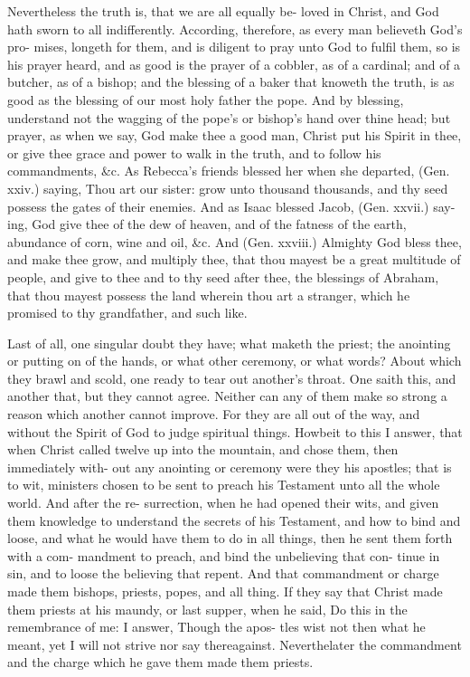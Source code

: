 \documentclass{custom}
\begin{document}
Nevertheless the truth is, that we are all equally be- 
loved in Christ, and God hath sworn to all indifferently. 
According, therefore, as every man believeth God's pro- 
mises, longeth for them, and is diligent to pray unto God 
to fulfil them, so is his prayer heard, and as good is the 
prayer of a cobbler, as of a cardinal; and of a butcher, 
as of a bishop; and the blessing of a baker that knoweth 
the truth, is as good as the blessing of our most holy 
father the pope. And by blessing, understand not the
wagging of the pope's or bishop's hand over thine head;
but prayer, as when we say, God make thee a good man,
Christ put his Spirit in thee, or give thee grace and power 
to walk in the truth, and to follow his commandments, 
&c. As Rebecca's friends blessed her when she departed, 
(Gen. xxiv.) saying, Thou art our sister: grow unto 
thousand thousands, and thy seed possess the gates of their 
enemies. And as Isaac blessed Jacob, (Gen. xxvii.) say- 
ing, God give thee of the dew of heaven, and of the fatness 
of the earth, abundance of corn, wine and oil, &c. And 
(Gen. xxviii.) Almighty God bless thee, and make thee 
grow, and multiply thee, that thou mayest be a great 
multitude of people, and give to thee and to thy seed 
after thee, the blessings of Abraham, that thou mayest 
possess the land wherein thou art a stranger, which he 
promised to thy grandfather, and such like. 

Last of all, one singular doubt they have; what maketh 
the priest; the anointing or putting on of the hands, or 
what other ceremony, or what words? About which they 
brawl and scold, one ready to tear out another's throat. 
One saith this, and another that, but they cannot agree. 
Neither can any of them make so strong a reason which 
another cannot improve. For they are all out of the way, 
and without the Spirit of God to judge spiritual things. 
Howbeit to this I answer, that when Christ called twelve up 
into the mountain, and chose them, then immediately with- 
out any anointing or ceremony were they his apostles; 
that is to wit, ministers chosen to be sent to preach his 
Testament unto all the whole world. And after the re- 
surrection, when he had opened their wits, and given 
them knowledge to understand the secrets of his Testament, 
and how to bind and loose, and what he would have them 
to do in all things, then he sent them forth with a com- 
mandment to preach, and bind the unbelieving that con- 
tinue in sin, and to loose the believing that repent. And 
that commandment or charge made them bishops, priests, 
popes, and all thing. If they say that Christ made them 
priests at his maundy, or last supper, when he said, Do 
this in the remembrance of me: I answer, Though the apos- 
tles wist not then what he meant, yet I will not strive nor 
say thereagainst. Neverthelater the commandment and the 
charge which he gave them made them priests. 
\end{document}
